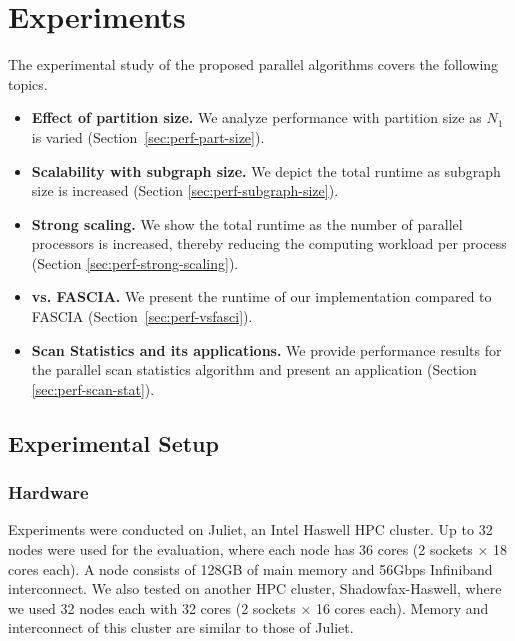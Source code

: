 \section{Experiments}
\label{sec:experiments}
The experimental study of the proposed parallel algorithms covers the following topics.

\begin{itemize}
\item
\textbf{Effect of partition size.} We analyze performance with partition size as $N_1$ is varied (Section~\ref{sec:perf-part-size}).

\item
\textbf{Scalability with subgraph size.} We depict the total runtime as subgraph size is increased (Section \ref{sec:perf-subgraph-size}).

\item 
\textbf{Strong scaling.} We show the total runtime as the number of parallel processors is increased, thereby reducing the computing workload per process (Section \ref{sec:perf-strong-scaling}).

\item
\textbf{\ouralgo{} vs. FASCIA.} We present the runtime of our implementation compared to FASCIA (Section~\ref{sec:perf-vsfasci}).

\item
\textbf{Scan Statistics and its applications.} We provide performance results for the parallel scan statistics algorithm and present an application (Section \ref{sec:perf-scan-stat}).

\end{itemize}

\subsection{Experimental Setup}
\subsubsection{Hardware}
Experiments were conducted on Juliet, an Intel Haswell HPC cluster. Up to 32 nodes were used for the evaluation, where each node has 36 cores (2 sockets $\times$ 18 cores each). A node consists of 128GB of main memory and 56Gbps Infiniband interconnect. We also tested on another HPC cluster, Shadowfax-Haswell, where we used 32 nodes each with 32 cores (2 sockets $\times$ 16 cores each). Memory and interconnect of this cluster are similar to those of Juliet.


